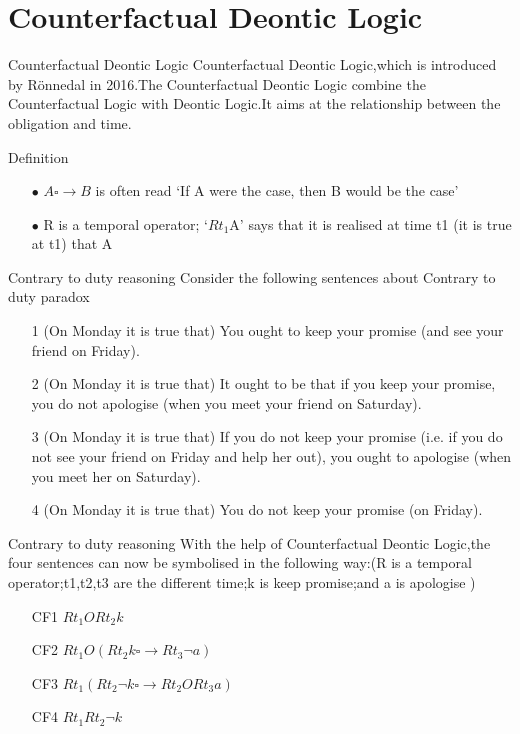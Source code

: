 \documentclass{beamer}
\begin{document}
\section{Counterfactual Deontic Logic}
\begin{frame}{Counterfactual Deontic Logic}
Counterfactual Deontic Logic,which is introduced by Rönnedal in 2016.The Counterfactual Deontic Logic combine the Counterfactual Logic with Deontic Logic.It aims at the relationship between the obligation and time.
\begin{block}{Definition}
\begin{enumerate}
  \item[$\bullet$]$A\square \rightarrow B$ is often read ‘If A were the case, then B would be the case’
\item[$\bullet$]R is a temporal operator; ‘$Rt_{1}$A’ says that it is realised at time t1 (it is true at t1) that A
\end{enumerate}
\end{block}
\end{frame}
 \begin{frame}{Contrary to duty reasoning}
 Consider the following sentences about Contrary to duty paradox
\begin{enumerate}
\item[1] (On Monday it is true that) You ought to keep your promise (and see your friend on Friday).
\item[2] (On Monday it is true that) It ought to be that if you keep your promise, you do not apologise (when you meet your friend on Saturday).
\item[3](On Monday it is true that) If you do not keep your promise (i.e. if you do not see your friend on Friday and help her out), you ought to apologise (when you meet her on Saturday).
\item[4](On Monday it is true that) You do not keep your promise (on Friday).
\end{enumerate}
     
 \end{frame}
 \begin{frame}{Contrary to duty reasoning}
 With the help of Counterfactual Deontic Logic,the four sentences can now be symbolised in the following way:(R is a temporal operator;t1,t2,t3 are the different time;k is keep promise;and a is apologise )
\begin{enumerate}
\item[CF1]$Rt_{1}ORt_{2}k$
\item[CF2]$Rt_{1}O(Rt_{2}k \square \rightarrow Rt_{3}\neg a)$
\item[CF3]$Rt_{1}(Rt_{2}\neg k \square \rightarrow Rt_{2}ORt_{3}a)$
\item[CF4]$Rt_{1}Rt_{2}\neg k$
\end{enumerate}
 \end{frame}
\end{document}
